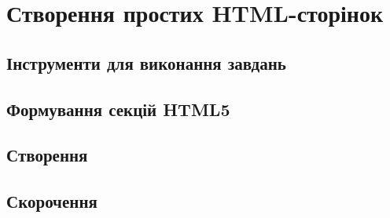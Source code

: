 \chapter{Створення простих HTML-сторінок}
\nopagebreak[4]
\section{Інструменти для виконання завдань}

\nopagebreak[4]
\section{Формування секцій HTML5}
\nopagebreak[4]



\pagebreak[3]

\section{Створення }
\nopagebreak[4]



\pagebreak[3]

\section{Скорочення}
\nopagebreak[4]



\pagebreak[3]
